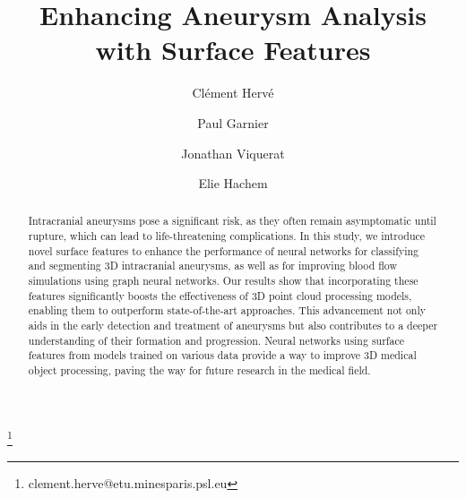 \documentclass[%
 reprint,
 amsmath,amssymb,
 aps,
 floatfix,
 nofootinbib,
]{revtex4-2}
\begin{document}

\title{Enhancing Aneurysm Analysis with Surface Features}

\author{Clément Hervé}
\thanks{clement.herve@etu.minesparis.psl.eu}

\author{Paul Garnier}

\author{Jonathan Viquerat}

\author{Elie Hachem}


\begin{abstract}
Intracranial aneurysms pose a significant risk, as they often remain asymptomatic until rupture, which can lead to life-threatening complications. In this study, we introduce novel surface features to enhance the performance of neural networks for classifying and segmenting 3D intracranial aneurysms, as well as for improving blood flow simulations using graph neural networks. Our results show that incorporating these features significantly boosts the effectiveness of 3D point cloud processing models, enabling them to outperform state-of-the-art approaches. This advancement not only aids in the early detection and treatment of aneurysms but also contributes to a deeper understanding of their formation and progression. Neural networks using surface features from models trained on various data provide a way to improve 3D medical object processing, paving the way for future research in the medical field.
\end{abstract}

\makeatletter
\renewcommand{\MakeTextUppercase}[1]{#1}
\renewcommand{\section}{\@startsection{section}{1}{0pt}{-3.5ex plus -1ex minus -.2ex}{2.3ex plus .2ex}{\normalfont\large\bfseries}}
\renewcommand{\subsection}{\@startsection{subsection}{2}{0pt}{-3.25ex plus -1ex minus -.2ex}{1.5ex plus .2ex}{\normalfont\bfseries\raggedright}}
\renewcommand{\thesection}{\arabic{section}}
\renewcommand{\thesubsection}{\thesection.\arabic{subsection}}
\renewcommand{\bibsection}{\section*{References}}
\makeatother
\end{document}
